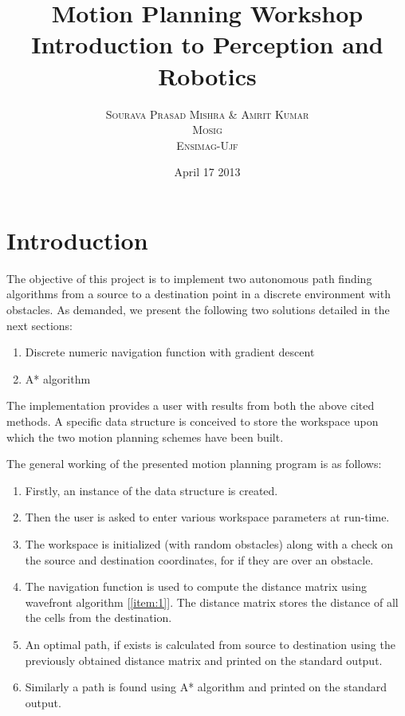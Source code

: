 \documentclass[12pt]{article}
\title{Motion Planning Workshop \\ Introduction to Perception and Robotics}
\author{\textsc{Sourava Prasad Mishra} \& \textsc{Amrit Kumar}
  \\ \textsc{Mosig} \\ \textsc{Ensimag-Ujf}  }
\date{April 17 2013}
\begin{document}
\maketitle

\section{Introduction}

	The objective of this project is to implement two autonomous path
  finding algorithms from a source to a destination point in a
  discrete environment with obstacles. As demanded, we present the
  following two solutions detailed in the next sections:

  \begin{enumerate}
	\item Discrete numeric navigation function with gradient descent
	\item A* algorithm
	\end{enumerate}

The implementation provides a user with results from both the above
cited methods. A specific data structure is conceived to store the
workspace upon which the two motion planning schemes have been built.

The general working of the presented motion planning program is as follows:
	\begin{enumerate}
	\item Firstly, an instance of the data structure is created.
	\item Then the user is asked to enter various workspace parameters
    at run-time. 
	\item The workspace is initialized (with random obstacles) along with a check on the source and destination coordinates, for if they are over an obstacle.
	\item The navigation function is used to compute the distance
    matrix using \textsf{wavefront algorithm} [\ref{item:1}]. The distance matrix
    stores the distance of all the cells from the destination.
	\item An optimal path, if exists is calculated from source to
    destination using the previously obtained distance matrix and printed
    on the standard output.
	\item Similarly a path is found using A* algorithm and printed on the standard output.
	\end{enumerate}
\end{document}
